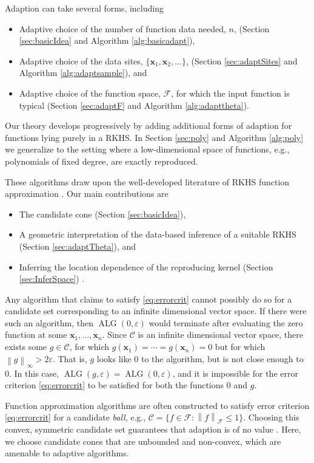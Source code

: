 \documentclass[]{mcom-l}
\theoremstyle{remark}
\DeclareMathOperator{\ALG}{ALG}
\newcommand{\bx}{{\boldsymbol{x}}}
\newcommand{\cc}{\mathcal{C}}
\newcommand{\calf}{{\mathcal{F}}}
\newcommand{\norm}[2][{}]{\ensuremath{\left \lVert #2 \right \rVert}_{#1}}
\begin{document}
Adaption can take several forms, including
\begin{itemize}
    \item Adaptive choice of the number of function data needed, $n$, (Section \ref{sec:basicIdea} and Algorithm \ref{alg:basicadapt}),
    \item Adaptive choice of the data sites, $\{\bx_1, \bx_2, \ldots\}$,  (Section \ref{sec:adaptSites} and Algorithm \ref{alg:adaptsample}), and
    \item Adaptive choice of the function space, $\calf$, for which the input function is typical  (Section \ref{sec:adaptF} and Algorithm \ref{alg:adapttheta}).
\end{itemize}
Our theory develops progressively by adding additional forms of adaption for functions lying purely in a RKHS.  In Section \ref{sec:poly} and Algorithm \ref{alg:poly} we generalize to the setting where a low-dimensional space of functions, e.g., polynomials of fixed degree, are exactly reproduced.

These algorithms draw upon the well-developed literature of RKHS function approximation \cite{Buh03a,Fas07a,FasMcC15a,ForFly15a,ForEtal09,RasWil06a,SchWen06a,Wah85a,Wen05a}.  Our main contributions are 
\begin{itemize}
	\item The candidate cone (Section \ref{sec:basicIdea}),
	\item A geometric interpretation of the data-based inference of a suitable RKHS (Section  \ref{sec:adaptTheta}), and
	\item Inferring the location dependence of the reproducing kernel (Section \ref{sec:InferSpace}) .
\end{itemize}

Any algorithm that claims to satisfy \eqref{eq:errorcrit} cannot possibly do so for a candidate set corresponding to an infinite dimensional vector space.  If there were such an algorithm, then $\ALG(0,\varepsilon)$ would terminate after evaluating the zero function at some $\bx_1, \ldots, \bx_n$.  Since $\cc$ is an infinite dimensional vector space, there exists some $g \in \cc$, for which $g(\bx_1) = \cdots = g(\bx_n) = 0$ but for which $\norm[\infty]{g} > 2 \varepsilon$.  That is, $g$ looks like $0$ to the algorithm, but is not close enough to $0$.  In this case, $\ALG(g,\varepsilon) = \ALG(0,\varepsilon)$, and it is impossible for the error criterion \eqref{eq:errorcrit} to be satisfied for both the functions $0$ and $g$.

Function approximation algorithms are often constructed to satisfy error criterion \eqref{eq:errorcrit} for a candidate \emph{ball}, e.g., $\cc = \{f \in \calf : \norm[\calf]{f} \le 1\}$.  Choosing this convex, symmetric candidate set guarantees that adaption is of no value \cite{Bak71}.  Here, we choose candidate cones that are unbounded and non-convex, which are amenable to adaptive algorithms.
\end{document}
